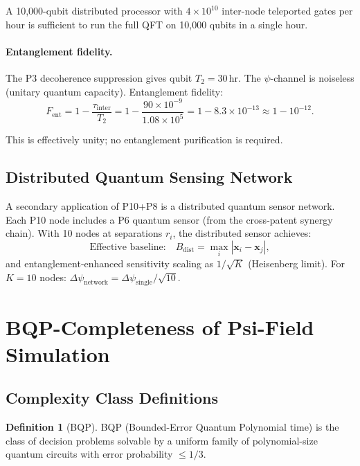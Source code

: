 \documentclass[11pt]{article}
\theoremstyle{definition}
\newtheorem{definition}[theorem]{Definition}
\theoremstyle{remark}
\begin{document}
A 10,000-qubit distributed processor with $4\times10^{10}$
inter-node teleported gates per hour is sufficient to run the full QFT
on 10,000 qubits in a single hour.

\paragraph{Entanglement fidelity.}
The P3 decoherence suppression gives qubit $T_2 = 30\,\mathrm{hr}$.
The $\psi$-channel is noiseless (unitary quantum capacity). Entanglement
fidelity:
\begin{equation}
F_{\mathrm{ent}} = 1 - \frac{\tau_{\mathrm{inter}}}{T_2}
= 1 - \frac{90\times10^{-9}}{1.08\times10^5}
= 1 - 8.3\times10^{-13} \approx 1 - 10^{-12}.
\label{eq:ent_fidelity}
\end{equation}

This is effectively unity; no entanglement purification is required.

\subsection{Distributed Quantum Sensing Network}

A secondary application of P10+P8 is a distributed quantum sensor network.
Each P10 node includes a P6 quantum sensor (from the cross-patent synergy
chain). With 10 nodes at separations $r_i$, the distributed sensor achieves:
\begin{equation}
\text{Effective baseline:} \quad B_{\mathrm{dist}} = \max_i |\mathbf{x}_i - \mathbf{x}_j|,
\end{equation}
and entanglement-enhanced sensitivity scaling as $1/\sqrt{K}$ (Heisenberg
limit). For $K = 10$ nodes:
$\Delta\psi_{\mathrm{network}} = \Delta\psi_{\mathrm{single}}/\sqrt{10}$.

\section{BQP-Completeness of Psi-Field Simulation}
\label{sec:bqp_completeness}

\subsection{Complexity Class Definitions}

\begin{definition}[BQP]
\textsc{BQP} (Bounded-Error Quantum Polynomial time) is the class of
decision problems solvable by a uniform family of polynomial-size quantum
circuits with error probability $\leq 1/3$.
\end{definition}
\end{document}
